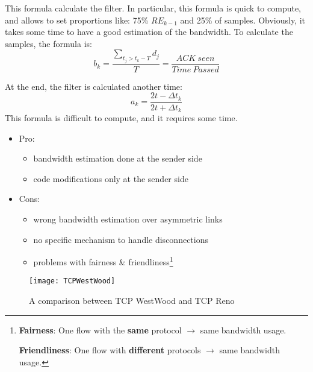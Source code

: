 This formula calculate the filter. In particular, this formula is quick to
compute, and allows to set proportions like: 75\% $RE_{k-1}$ and 25\% of
samples. Obviously, it takes some time to have a good estimation of the
bandwidth.
To calculate the samples, the formula is:
\begin{equation}
b_k = \frac{ \sum_{t_j > t_k-T} d_j }{T} = \frac{ACK\ seen}{Time\ Passed}
\end{equation}

At the end, the filter is calculated another time:
\begin{equation}
a_k = \frac{2t - \Delta t_k}{2t + \Delta t_k}
\end{equation}
This formula is difficult to compute, and it requires some time.
\begin{itemize}
\item Pro:
  \begin{itemize}
    \item bandwidth estimation done at the sender side
    \item code modifications only at the sender side
  \end{itemize}
\item Cons:
  \begin{itemize}
  \item wrong bandwidth estimation over asymmetric links
  \item no specific mechanism to handle disconnections
  \item problems with fairness \& friendliness\footnote{\textbf{Fairness}:
    One flow with the \textbf{same} protocol $\rightarrow$ same
    bandwidth usage.
    
    \textbf{Friendliness}: One flow with \textbf{different} protocols
    $\rightarrow$ same bandwidth usage.}
  \end{itemize}
\end{itemize}

\begin{figure}[h]
\centering
\texttt{[image: TCPWestWood]}
\caption[TCP WestWood vs TCP Reno]{A comparison between TCP WestWood and TCP Reno}
\label{fig:tcpw:tcpwwvstcpr}
\end{figure}
